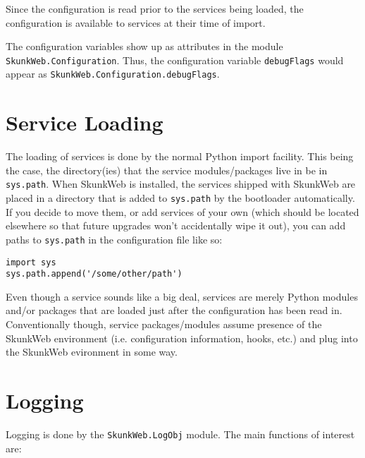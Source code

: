 \documentclass{manual}
\begin{document}
Since the configuration is read prior to the services being loaded,
the configuration is available to services at their time of import.

The configuration variables show up as attributes in the module
\verb!SkunkWeb.Configuration!.  Thus, the configuration
variable \texttt{debugFlags} would appear as
\verb!SkunkWeb.Configuration.debugFlags!.

\section{Service Loading}
The loading of services is done by the normal Python import facility.
This being the case, the directory(ies) that the service
modules/packages live in  be in \texttt{sys.path}.  When
SkunkWeb is installed, the services shipped with SkunkWeb are placed
in a directory that is added to \texttt{sys.path} by the bootloader
automatically.  If you decide to move them, or add services of your
own (which should be located elsewhere so that future upgrades won't
accidentally wipe it out), you can add paths to \texttt{sys.path} in
the configuration file like so:
\begin{verbatim}
import sys
sys.path.append('/some/other/path')
\end{verbatim}

Even though a service sounds like a big deal, services are merely
Python modules and/or packages that are loaded 
just after the configuration has been read in.  Conventionally though,
service packages/modules assume presence of the SkunkWeb environment
(i.e. configuration information, hooks, etc.) and plug into the
SkunkWeb evironment in some way.


\section{Logging}
Logging is done by the \verb!SkunkWeb.LogObj! module.  The main
functions of interest are:
\end{document}
